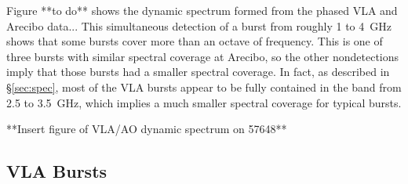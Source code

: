 \documentclass[twocolumn]{aastex61}
\begin{document}
Figure **to do** shows the dynamic spectrum formed from the phased VLA and Arecibo data... 
This simultaneous detection of a burst from roughly 1 to 4~GHz shows that some bursts cover more than an octave of frequency. This is one of three bursts with similar spectral coverage at Arecibo, so the other nondetections imply that those bursts had a smaller spectral coverage. In fact, as described in \S \ref{sec:spec}, most of the VLA bursts appear to be fully contained in the band from 2.5 to 3.5~GHz, which implies a much smaller spectral coverage for typical bursts.

**Insert figure of VLA/AO dynamic spectrum on 57648**


\subsection{VLA Bursts}
\end{document}
